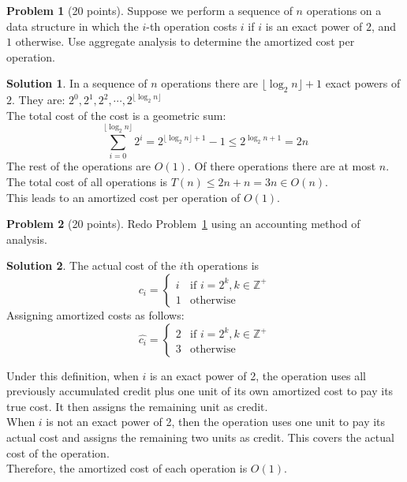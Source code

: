 \documentclass{article}
\theoremstyle{definition}
\newtheorem{problem}{Problem}
\newtheorem*{solution}{Solution}
\begin{document}
\begin{problem}[20 points] \label{base}
  Suppose we perform a sequence of $n$ operations on a data structure
  in which the $i$-th operation costs $i$ if $i$ is an exact power of
  $2$, and $1$ otherwise. Use aggregate analysis to determine the
  amortized cost per operation.
\end{problem}
\begin{solution}
In a sequence of $n$ operations there are $\lfloor\log_2n\rfloor+1$ exact powers of $2$. 
They are: $2^0,2^1,2^2,\cdots,2^{\lfloor\log_2n\rfloor}$\\
The total cost of the cost is a geometric sum:
\[\sum_{i=0}^{\lfloor\log_2n\rfloor}2^i=2^{\lfloor\log_2n\rfloor+1}-1\leq2^{\log_2 n+1}=2n\]
The rest of the operations are $O(1)$. Of there operations there are at most $n$.
The total cost of all operations is $T(n)\leq2n+n=3n\in O(n)$.\\
This leads to an amortized cost per operation of $O(1)$.
\end{solution}

\clearpage
\begin{problem}[20 points]
 Redo Problem~\ref{base} using an accounting method of analysis.
\end{problem}
\begin{solution}
The actual cost of the $i$th operations is
\[c_i=\begin{cases}
i & \text{if }i=2^k,k\in\mathbb{Z^+} \\
1 & \text{otherwise}
\end{cases}\]
Assigning amortized costs as follows:
\[\hat{c_i}=\begin{cases}
2 & \text{if }i=2^k,k\in\mathbb{Z^+} \\
3 & \text{otherwise}
\end{cases}\]

\noindent
Under this definition, when $i$ is an exact power of 2, the operation uses all previously accumulated credit plus one unit of its own amortized cost to pay its true cost. It then assigns the remaining unit as credit.\\

\noindent
When $i$ is not an exact power of 2, then the operation uses one unit to pay its actual cost and assigns the remaining two units as credit. This covers the actual cost of the operation.\\

\noindent
Therefore, the amortized cost of each operation is $O(1)$.    

\end{solution}
\end{document}
